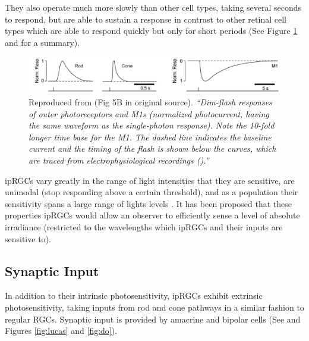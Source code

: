 They also operate much more slowly than other cell types, taking several seconds to respond, but are able to sustain a response in contrast to other retinal cell types which are able to respond quickly but only for short periods (See Figure \ref{fig:melspeed} and \citet[p.210]{do_melanopsin_2019} for a summary).

\begin{figure}[htbp]
\includegraphics[max width=\textwidth, center]{figs/LitRev/melspeed.png}
\caption{Reproduced from \citet{do_melanopsin_2019} (Fig 5B in original source). \textit{``Dim-flash responses of outer photoreceptors and M1s (normalized photocurrent, having the same waveform as the single-photon response). Note the 10-fold
longer time base for the M1. The dashed line indicates the baseline current and the timing of the flash is shown below the curves, which are traced from
electrophysiological recordings (\citet{emanuel_biophysical_2017,field_nonlinear_2002,nikonov_physiological_2006}).''}}
\label{fig:melspeed}
\end{figure}

\Glspl{ipRGC} vary greatly in the range of light intensities that they are sensitive, are unimodal (stop responding above a certain threshold), and as a population their sensitivity spans a large range of lights levels \citep{do_melanopsin_2019}. It has been proposed that these properties \glspl{ipRGC} would allow an observer to efficiently sense a level of absolute irradiance \citep{brown_melanopsin_2010,milner_population_2017} (restricted to the wavelengths which ipRGCs and their inputs are sensitive to). 

\subsection{Synaptic Input}

In addition to their intrinsic photosensitivity, \glspl{ipRGC} exhibit extrinsic photosensitivity, taking inputs from rod and cone pathways in a similar fashion to regular \glspl{RGC}. Synaptic input is provided by amacrine and bipolar cells (See \citet{belenky_melanopsin_2003} and Figures \ref{fig:lucas} and \ref{fig:do}). 

